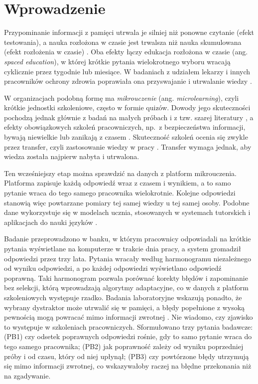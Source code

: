 \section{Wprowadzenie}

Przypominanie informacji z pamięci utrwala je silniej niż ponowne czytanie (efekt testowania),
a nauka rozłożona w czasie jest trwalsza niż nauka skumulowana (efekt rozłożenia w czasie)
\citep{roediger2006,cepeda2006}. Oba efekty łączy edukacja rozłożona w czasie (ang. \emph{spaced
education}), w której krótkie pytania wielokrotnego wyboru wracają cyklicznie przez tygodnie lub
miesiące. W badaniach z udziałem lekarzy i innych pracowników ochrony zdrowia poprawiała ona
przyswajanie i utrwalanie wiedzy \citep{kerfoot2009,phillips2019}.

W organizacjach podobną formę ma \emph{mikrouczenie} (ang. \emph{microlearning}), czyli krótkie
jednostki szkoleniowe, często w formie quizów. Dowody jego skuteczności pochodzą jednak głównie
z badań na małych próbach i z tzw. szarej literatury \citep{taylor2022}, a efekty obowiązkowych
szkoleń pracowniczych, np.\ z bezpieczeństwa informacji, bywają niewielkie lub zanikają z czasem
\citep{reinheimer2020}. Skuteczność szkoleń ocenia się zwykle przez transfer, czyli zastosowanie
wiedzy w pracy \citep{blume2010}. Transfer wymaga jednak, aby wiedza została najpierw nabyta
i utrwalona.

Ten wcześniejszy etap można sprawdzić na danych z platform mikrouczenia. Platforma zapisuje każdą
odpowiedź wraz z czasem i wynikiem, a to samo pytanie wraca do tego samego pracownika wielokrotnie.
Kolejne odpowiedzi stanowią więc powtarzane pomiary tej samej wiedzy u tej samej osoby. Podobne dane
wykorzystuje się w modelach ucznia, stosowanych w systemach tutorskich i aplikacjach do nauki języków
\citep{corbett1994,settles2016}.

Badanie przeprowadzono w banku, w którym pracownicy odpowiadali na krótkie pytania wyświetlane na
komputerze w trakcie dnia pracy, a system gromadził odpowiedzi przez trzy lata. Pytania wracały według
harmonogramu niezależnego od wyniku odpowiedzi, a po każdej odpowiedzi wyświetlano odpowiedź poprawną.
Taki harmonogram pozwala porównać korekty błędów i zapominanie bez selekcji, którą wprowadzają
algorytmy adaptacyjne, co w danych z platform szkoleniowych występuje rzadko. Badania laboratoryjne
wskazują ponadto, że wybrany dystraktor może utrwalić się w pamięci, a błędy popełnione z wysoką
pewnością mogą powracać mimo informacji zwrotnej \citep{butler2008,butler2011}. Nie wiadomo, czy
zjawisko to występuje w szkoleniach pracowniczych. Sformułowano trzy pytania badawcze:
(PB1) czy odsetek poprawnych odpowiedzi rośnie, gdy to samo pytanie wraca do tego samego pracownika;
(PB2) jak poprawność zależy od wyniku poprzedniej próby i od czasu, który od niej upłynął;
(PB3) czy powtórzone błędy utrzymują się mimo informacji zwrotnej, co wskazywałoby raczej na błędne
przekonania niż na zgadywanie.
